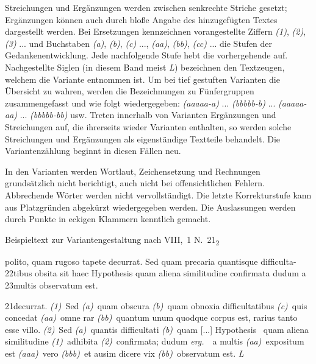 Streichungen und Ergänzungen werden zwischen senkrechte Striche gesetzt;
Ergänzungen können auch durch bloße Angabe des hinzugefügten Textes dargestellt werden.
Bei Ersetzungen kennzeichnen vorangestellte Ziffern \textit{(1)}, \textit{(2)}, \textit{(3)} ... und Buchstaben \textit{(a)}, \textit{(b)}, \textit{(c)} ..., \textit{(aa)}, \textit{(bb)}, \textit{(cc)} ... die Stufen der Gedankenentwicklung. Jede nachfolgende Stufe hebt die vorhergehende auf. Nachgestellte Siglen (in diesem Band meist \textit{L}) bezeichnen den Textzeugen, welchem die Variante entnommen ist. Um bei tief gestuften Varianten die Übersicht zu wahren, werden die Bezeichnungen zu Fünfergruppen zusammengefasst und wie folgt wiedergegeben: \textit{(aaaaa-a)} ... \textit{(bbbbb-b)} ... \textit{(aaaaa-aa)} ... \textit{(bbbbb-bb)} usw. Treten innerhalb von Varianten Ergänzungen und Streichungen auf, die ihrerseits wieder Varianten enthalten, so werden solche Streichungen und Ergänzungen als eigenständige Textteile behandelt. Die Variantenzählung beginnt in diesen Fällen neu.\par
In den Varianten werden Wortlaut, Zeichensetzung und Rechnungen grundsätzlich nicht berichtigt, auch nicht bei offensichtlichen Fehlern. Abbrechende Wörter werden nicht vervollständigt. Die letzte Korrekturstufe kann aus Platzgründen abgekürzt wiedergegeben werden. Die Auslassungen werden durch Punkte in eckigen Klammern kenntlich gemacht.\par\vspace{2.0ex}
\noindent Beispieltext zur Variantengestaltung nach VIII,~1 N.~21\textsubscript{2}\par\vspace{1.0ex}
\hspace{5mm}polito, quam rugoso tapete decurrat. Sed quam precaria quantisque difficulta-\newline %
{\scriptsize22}\hspace{5mm}tibus obsita sit haec Hypothesis quam aliena similitudine confirmata dudum a\newline
{\scriptsize23}\hspace{5mm}multis observatum est.\par\vspace{0.5cm}
\noindent \footnotesize 21\enskip decurrat. \textit{(1)}~Sed \textit{(a)}~quam obscura \textit{(b)}~quam obnoxia difficultatibus \textit{(c)}~quis concedat \textit{(aa)}~omne rar \textit{(bb)}~quantum unum quodque corpus est, rarius tanto esse villo. \textit{(2)}~Sed \textit{(a)}~quantis difficultati \textit{(b)}~quam [...] Hypothesis \textbar\ quam aliena similitudine \textit{(1)}~adhibita \textit{(2)}~confirmata; dudum \textit{erg.}\ \textbar\ a multis \textit{(aa)}~expositum est \textit{(aaa)}~vero \textit{(bbb)}~et ausim dicere vix \textit{(bb)}~observatum est. \textit{L}\par
